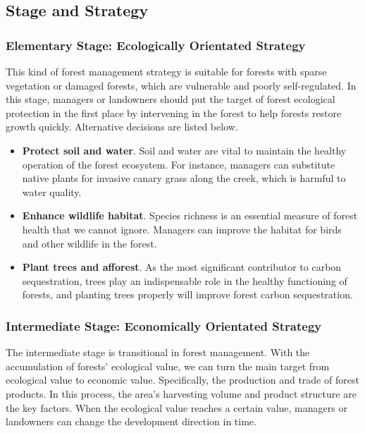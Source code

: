 \subsection{Stage and Strategy}

\subsubsection{Elementary Stage: Ecologically Orientated Strategy}

This kind of forest management strategy is suitable for forests with sparse vegetation or damaged forests, which are vulnerable and poorly self-regulated. In this stage, managers or landowners should put the target of forest ecological protection in the first place by intervening in the forest to help forests restore growth quickly. Alternative decisions are listed below.

\begin{itemize}
\item \textbf{Protect soil and water}. Soil and water are vital to maintain the healthy operation of the forest ecosystem. For instance, managers can substitute native plants for invasive canary grass along the creek, which is harmful to water quality.
\item \textbf{Enhance wildlife habitat}. Species richness is an essential measure of forest health that we cannot ignore. Managers can improve the habitat for birds and other wildlife in the forest.
\item \textbf{Plant trees and afforest}. As the most significant contributor to carbon sequestration, trees play an indispensable role in the healthy functioning of forests, and planting trees properly will improve forest carbon sequestration.
\end{itemize}

\subsubsection{Intermediate Stage: Economically Orientated Strategy}

The intermediate stage is transitional in forest management. With the accumulation of forests' ecological value, we can turn the main target from ecological value to economic value. Specifically, the production and trade of forest products. In this process, the area's harvesting volume and product structure are the key factors. When the ecological value reaches a certain value, managers or landowners can change the development direction in time.

